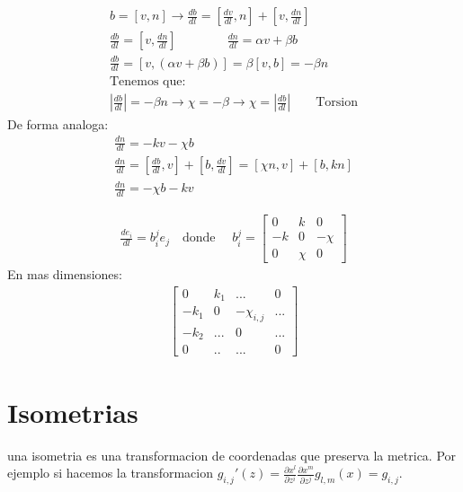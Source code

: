 \documentclass{article}
\newcommand{\caja}[3]{%
  \begin{tcolorbox}[colback=#1!5!white,colframe=#1!25!black,title=#2]
    #3
  \end{tcolorbox}%
}
\begin{document}
\begin{gather}
  b = [v,n] \rightarrow \frac{d b }{d l } = [\frac{d v }{d l}, n ] + [v, \frac{d n  }{d l }]\\
  \frac{d b }{d l} = [v, \frac{d n  }{d l }] \qquad  \qquad \frac{d n  }{d l } = \alpha v + \beta b \\
  \frac{d b  }{d l } = [v, (\alpha v+ \beta b)] = \beta[v,b] = -\beta n \\
  \text{Tenemos que: }\\
  \left|\frac{d b  }{d l } \right| = -\beta n \rightarrow \chi = -\beta \rightarrow \chi  = \left|\frac{d b  }{d l }\right| \qquad \text{Torsion}
\end{gather}
De forma analoga:
\begin{gather}
 \frac{d n  }{d l } = -kv-\chi b \\
 \frac{d n  }{d l } = [\frac{d b  }{d l }, v] + [b, \frac{d v  }{d l }] = [\chi n , v ]+ [b,kn ]\\
 \frac{d n  }{d l } = -\chi b - kv
\end{gather}
\caja{green}{Representacion matricial}{
  \begin{gather}
     \frac{d e_i  }{d l } = b_i ^ {j }e_j \quad \text{donde } \quad b_i^j = \begin{bmatrix}
         0 & k & 0 \\
         -k  & 0 & -\chi  \\
         0 & \chi  & 0
     \end{bmatrix}  
  \end{gather}
  En mas dimensiones:
  \begin{gather}
     \begin{bmatrix}
         0 & k_1 & ...  & 0  \\
         -k_1  & 0 & -\chi _{i,j }  & ...  \\
         -k_2  & ...  & 0  & ...  \\
         0  & ..  & ...  & 0
     \end{bmatrix}  
  \end{gather}
}

\section{Isometrias }
una isometria es una transformacion de coordenadas que preserva la metrica. Por ejemplo si hacemos la transformacion $ g _{i,j } ' (z) = \frac{\partial x^l  }{\partial z^i } \frac{\partial x^m  }{\partial z^j }g _{l,m } (x) = g _{i,j}  $. 
\end{document}
